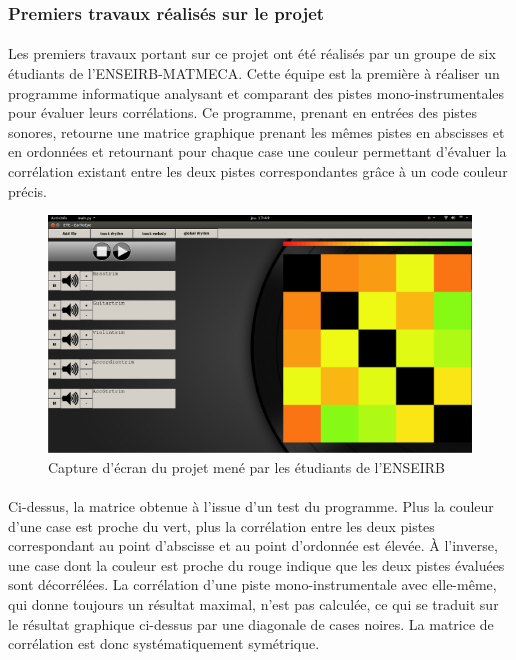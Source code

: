 \subsubsection{Premiers travaux réalisés sur le projet}
\paragraph{}
Les premiers travaux portant sur ce projet ont été réalisés par un
groupe de six étudiants de l'ENSEIRB-MATMECA. Cette équipe est la
première à réaliser un programme informatique analysant et comparant
des pistes mono-instrumentales pour évaluer leurs corrélations. Ce
programme, prenant en entrées des pistes sonores, retourne une matrice
graphique prenant les mêmes pistes en abscisses et en ordonnées et
retournant pour chaque case une couleur permettant d'évaluer la
corrélation existant entre les deux pistes correspondantes grâce à un
code couleur précis.

\begin{figure}[h]
 \centering
 \includegraphics[scale=0.5]{matriceenseirb.png}
 \caption{Capture d'écran du projet mené par les étudiants de l'ENSEIRB}
 \label{matrice-enseirb}
\end{figure}

\paragraph{}
Ci-dessus, la matrice obtenue à l'issue d'un test du programme. Plus
la couleur d'une case est proche du vert, plus la corrélation entre
les deux pistes correspondant au point d'abscisse et au point
d'ordonnée est élevée. À l'inverse, une case dont la couleur est
proche du rouge indique que les deux pistes évaluées sont
décorrélées. La corrélation d'une piste mono-instrumentale avec
elle-même, qui donne toujours un résultat maximal, n'est pas calculée,
ce qui se traduit sur le résultat graphique ci-dessus par une
diagonale de cases noires. La matrice de corrélation est donc
systématiquement symétrique.


